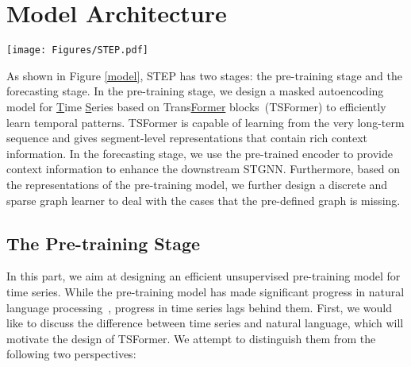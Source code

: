 \documentclass[sigconf]{acmart}
\begin{document}
 \section{Model Architecture}
\begin{figure*}[t]
  \centering
  \setlength{\abovecaptionskip}{0.2cm}
  \setlength{\belowcaptionskip}{-0.2cm}
  \texttt{[image: Figures/STEP.pdf]}
  \caption{
  {\color{black}
  The overview of the proposed STEP framework.
  \underline{Left}: the pre-training stage. We split very long-term time series into segments and feed them into TSFormer, which is trained via the masked autoencoding strategy.
  \underline{Right}: the forecasting stage. We enhance the downstream STGNN based on the segment-level representations of the pre-trained TSFormer.}
  }
  \label{model}
\end{figure*}
As shown in Figure \ref{model}, STEP has two stages: the pre-training stage and the forecasting stage.
In the pre-training stage, we design a masked autoencoding model for \underline{T}ime \underline{S}eries based on Trans\underline{Former} blocks~(TSFormer) to efficiently learn temporal patterns.
TSFormer is capable of learning from the very long-term sequence and gives segment-level representations that contain rich context information.
In the forecasting stage, we use the pre-trained encoder to provide context information to enhance the downstream STGNN.
Furthermore, based on the representations of the pre-training model, we further design a discrete and sparse graph learner to deal with the cases that the pre-defined graph is missing.

\vspace{-0.1cm}
\subsection{The Pre-training Stage}
In this part, we aim at designing an efficient unsupervised pre-training model for time series.
While the pre-training model has made significant progress in natural language processing~\cite{2019BERT, 2020GPT, 2018ELMO}, progress in time series lags behind them.
First, we would like to discuss the difference between time series and natural language, which will motivate the design of TSFormer.
We attempt to distinguish them from the following two perspectives:
\end{document}
